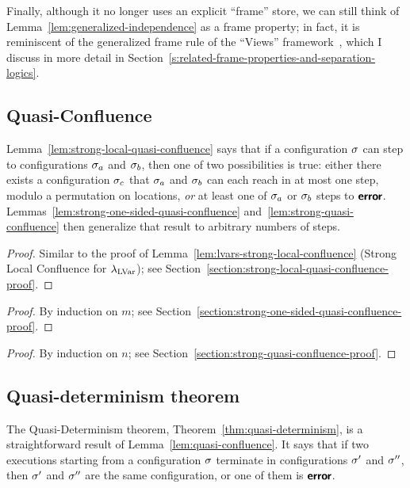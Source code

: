 Finally, although it no longer uses an explicit ``frame'' store, we
can still think of Lemma~\ref{lem:generalized-independence} as a frame
property; in fact, it is reminiscent of the generalized frame rule of
the ``Views'' framework~\cite{views}, which I discuss in more detail
in Section~\ref{s:related-frame-properties-and-separation-logics}.

\subsection{Quasi-Confluence}\label{subsection:quasi-quasi-confluence}

Lemma~\ref{lem:strong-local-quasi-confluence} says that if a
configuration $\sigma$ can step to configurations $\sigma_a$ and
$\sigma_b$, then one of two possibilities is true: either there exists
a configuration $\sigma_c$ that $\sigma_a$ and $\sigma_b$ can each reach
in at most one step, modulo a permutation on locations, \emph{or} at
least one of $\sigma_a$ or $\sigma_b$ steps to $\textbf{\textsf{error}}$.
Lemmas~\ref{lem:strong-one-sided-quasi-confluence}
and~\ref{lem:strong-quasi-confluence} then generalize that result to
arbitrary numbers of steps.

\LemStrongLocalQuasiConfluence
\begin{proof}
  Similar to the proof of
  Lemma~\ref{lem:lvars-strong-local-confluence} (Strong Local
  Confluence for $\lambda_{\textrm{LVar}}$); see
  Section~\ref{section:strong-local-quasi-confluence-proof}.
\end{proof}

\LemStrongOneSidedQuasiConfluence
\begin{proof}
  By induction on $m$; see
  Section~\ref{section:strong-one-sided-quasi-confluence-proof}.
\end{proof}

\LemStrongQuasiConfluence
\begin{proof}
  By induction on $n$; see
  Section~\ref{section:strong-quasi-confluence-proof}.
\end{proof}

\LemQuasiConfluence
 
\subsection{Quasi-determinism theorem}\label{subsection:quasi-quasi-determinism}

The Quasi-Determinism theorem, Theorem~\ref{thm:quasi-determinism}, is
a straightforward result of Lemma~\ref{lem:quasi-confluence}.  It says
that if two executions starting from a configuration $\sigma$ terminate
in configurations $\sigma'$ and $\sigma''$, then $\sigma'$ and $\sigma''$
are the same configuration, or one of them is $\textbf{\textsf{error}}$.

